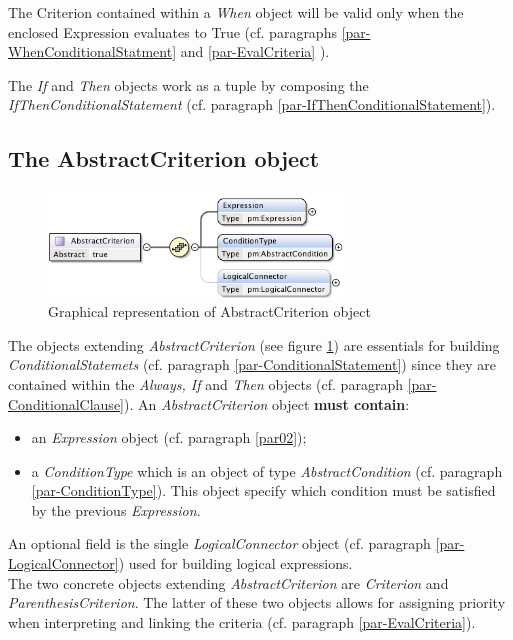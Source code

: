 \documentclass[a4paper,11pt] {ivoa}
\begin{document}
The Criterion contained within a {\it When} object will be valid only when the enclosed Expression
evaluates to True (cf. paragraphs \ref{par-WhenConditionalStatment} and \ref{par-EvalCriteria} ).



The {\it If} and {\it Then} objects work as a tuple by composing the  {\it
IfThenConditionalStatement} (cf. paragraph
\ref{par-IfThenConditionalStatement}).

\subsection{The AbstractCriterion object}\label{par-AbstractCriterion}
\begin{figure}[htbp]
\begin{center}
\includegraphics[width=0.7\textwidth]{pictures/AbstractCriterion.jpg} 
\caption{Graphical representation of AbstractCriterion object}
\label{Pic-AbstractCriterion}
\end{center}
\end{figure}
The objects extending {\it AbstractCriterion} (see figure \ref{Pic-AbstractCriterion}) are
essentials for building {\it ConditionalStatemets} (cf. paragraph \ref{par-ConditionalStatement})
since they are contained within the {\it Always, If} and {\it Then} objects (cf. paragraph
\ref{par-ConditionalClause}).
An {\it AbstractCriterion} object {\bf must contain}:
\begin{itemize}
\item an {\it Expression} object (cf. paragraph \ref{par02});
\item a {\it ConditionType} which is an object of type {\it AbstractCondition} (cf. paragraph 
\ref{par-ConditionType}).
This object specify which condition must be satisfied by the previous {\it Expression}.
\end{itemize}
An optional field is the single {\it LogicalConnector} object (cf. paragraph
\ref{par-LogicalConnector}) used for building logical expressions.\\
The two concrete objects extending  {\it AbstractCriterion}  are {\it Criterion} and {\it
ParenthesisCriterion}.  The latter of these two objects allows for assigning priority when
interpreting and linking the criteria (cf. paragraph \ref{par-EvalCriteria}).
\end{document}
